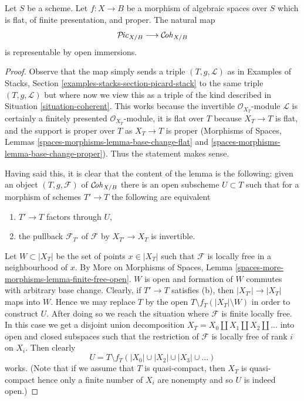 \begin{lemma}
\label{lemma-picard-stack-open-in-coh}
Let $S$ be a scheme. Let $f : X \to B$ be a morphism of algebraic spaces
over $S$ which is flat, of finite presentation, and proper.
The natural map
$$
\mathcal{P}\!\mathit{ic}_{X/B} \longrightarrow \mathcal{C}\!\mathit{oh}_{X/B}
$$
is representable by open immersions.
\end{lemma}

\begin{proof}
Observe that the map simply sends a triple $(T, g, \mathcal{L})$
as in Examples of Stacks, Section \ref{examples-stacks-section-picard-stack}
to the same triple $(T, g, \mathcal{L})$ but where now we view
this as a triple of the kind described in
Situation \ref{situation-coherent}.
This works because the invertible $\mathcal{O}_{X_T}$-module
$\mathcal{L}$ is certainly a finitely presented $\mathcal{O}_{X_T}$-module,
it is flat over $T$ because $X_T \to T$ is flat, and the support is
proper over $T$ as $X_T \to T$ is proper
(Morphisms of Spaces, Lemmas \ref{spaces-morphisms-lemma-base-change-flat}
and \ref{spaces-morphisms-lemma-base-change-proper}).
Thus the statement makes sense.

\medskip\noindent
Having said this, it is clear that the content of the lemma is the
following: given an object $(T, g, \mathcal{F})$ of
$\mathcal{C}\!\mathit{oh}_{X/B}$ there is an open subscheme $U \subset T$
such that for a morphism of schemes $T' \to T$ the following
are equivalent
\begin{enumerate}
\item[(a)] $T' \to T$ factors through $U$,
\item[(b)] the pullback $\mathcal{F}_{T'}$ of
$\mathcal{F}$ by $X_{T'} \to X_T$ is invertible.
\end{enumerate}
Let $W \subset |X_T|$ be the set of points $x \in |X_T|$
such that $\mathcal{F}$ is locally free in a neighbourhood of $x$. By
More on Morphisms of Spaces, Lemma
\ref{spaces-more-morphisms-lemma-finite-free-open}.
$W$ is open and formation
of $W$ commutes with arbitrary base change.
Clearly, if $T' \to T$ satisfies (b), then $|X_{T'}| \to |X_T|$
maps into $W$. Hence we may replace $T$ by the open
$T \setminus f_T(|X_T| \setminus W)$ in order
to construct $U$. After doing so we reach the situation
where $\mathcal{F}$ is finite locally free.
In this case we get a disjoint union decomposition
$X_T = X_0 \amalg X_1 \amalg X_2 \amalg \ldots$
into open and closed subspaces such that the restriction of
$\mathcal{F}$ is locally free of rank $i$ on $X_i$. Then clearly
$$
U = T \setminus f_T(|X_0| \cup |X_2| \cup |X_3| \cup \ldots )
$$
works. (Note that if we assume that $T$ is quasi-compact, then
$X_T$ is quasi-compact hence only a finite number of $X_i$
are nonempty and so $U$ is indeed open.)
\end{proof}

